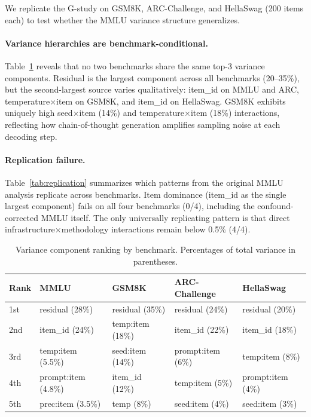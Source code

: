 \documentclass[letterpaper]{article}
\begin{document}
We replicate the G-study on GSM8K, ARC-Challenge, and HellaSwag (200 items each) to test whether the MMLU variance structure generalizes.

\paragraph{Variance hierarchies are benchmark-conditional.}
Table~\ref{tab:ranking} reveals that no two benchmarks share the same top-3 variance components.
Residual is the largest component across all benchmarks (20--35\%), but the second-largest source varies qualitatively: item\_id on MMLU and ARC, temperature$\times$item on GSM8K, and item\_id on HellaSwag.
GSM8K exhibits uniquely high seed$\times$item (14\%) and temperature$\times$item (18\%) interactions, reflecting how chain-of-thought generation amplifies sampling noise at each decoding step.

\paragraph{Replication failure.}
Table~\ref{tab:replication} summarizes which patterns from the original MMLU analysis replicate across benchmarks.
Item dominance (item\_id as the single largest component) fails on all four benchmarks (0/4), including the confound-corrected MMLU itself.
The only universally replicating pattern is that direct infrastructure$\times$methodology interactions remain below 0.5\% (4/4).

\begin{table}[t]
\centering
\caption{Variance component ranking by benchmark. Percentages of total variance in parentheses.}
\label{tab:ranking}
\small
\begin{tabular}{lllll}
\toprule
Rank & MMLU & GSM8K & ARC-Challenge & HellaSwag \\
\midrule
1st & residual (28\%) & residual (35\%) & residual (24\%) & residual (20\%) \\
2nd & item\_id (24\%) & temp:item (18\%) & item\_id (22\%) & item\_id (18\%) \\
3rd & temp:item (5.5\%) & seed:item (14\%) & prompt:item (6\%) & temp:item (8\%) \\
4th & prompt:item (4.8\%) & item\_id (12\%) & temp:item (5\%) & prompt:item (4\%) \\
5th & prec:item (3.5\%) & temp (8\%) & seed:item (4\%) & seed:item (3\%) \\
\bottomrule
\end{tabular}
\end{table}
\end{document}

